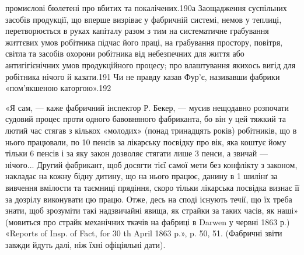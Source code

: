 промислові бюлетені про вбитих та покалічених.190а Заощадження
суспільних засобів продукції, що вперше визріває у фабричній
системі, немов у теплиці, перетворюється в руках капіталу разом
з тим на систематичне грабування життєвих умов робітника
підчас його праці, на грабування простору, повітря, світла
та засобів охорони робітника від небезпечних для життя або антигігієнічних
умов продукційного процесу; про влаштування якихось
вигід для робітника нічого й казати.191 Чи не правду казав
Фур’є, називавши фабрики «пом’якшеною каторгою».192

«Я сам, — каже фабричний інспектор Р. Бекер, — мусив нещодавно розпочати
судовий процес проти одного бавовняного фабриканта, бо він у цей тяжкий
та лютий час стягав з кількох «молодих» (понад тринадцять років)
робітників, що в нього працювали, по 10 пенсів за лікарську посвідку
про вік, яка коштує йому тільки 6 пенсів і за яку закон дозволяє стягати
лише 3 пенси, а звичай — нічого... Другий фабрикант, щоб досягти
тієї самої мети без конфлікту з законом, накладає на кожну бідну дитину,
що на нього працює, данину в 1 шилінґ за вивчення вмілости та
таємниці прядіння, скоро тільки лікарська посвідка визнає її за дозрілу
виконувати цю працю. Отже, десь на споді існують течії, що їх треба знати,
щоб зрозуміти такі надзвичайні явища, як страйки за таких часів, як
наші» (мовиться про страйк механічних ткачів на фабриці в Darwen у
червні 1863 р.) «Reports of Insp. of Fact, for 30 th April 1863 p.», p. 50,
51. (Фабричні звіти завжди йдуть далі, ніж їхні офіціяльні дати).

